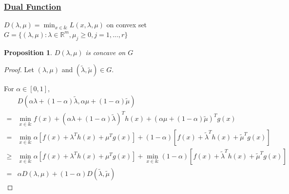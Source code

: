 \documentclass[11pt,a4paper]{article}
\newtheorem{proposition}{Proposition}
\begin{document}
\subsubsection*{\underline{Dual Function}}
$D(\lambda,\mu)=\min_{x\in\&}L(x,\lambda,\mu)$ on convex set $G=\{(\lambda,\mu):\lambda\in \mathbb{R}^m,\mu_j\geq 0,j=1,...,r\}$
\begin{proposition}
    $D(\lambda,\mu)$ is concave on $G$
\end{proposition}
\begin{proof}
    Let $(\lambda,\mu)$ and $(\tilde{\lambda},\tilde{\mu})\in G$.

    For $\alpha\in[0,1]$,
    \begin{equation}
        \begin{aligned}
            &D(\alpha\lambda+(1-\alpha)\tilde{\lambda},\alpha\mu+(1-\alpha)\tilde{\mu})\\
            =&\min_{x\in\&}f(x)+(\alpha\lambda+(1-\alpha)\tilde{\lambda})^Th(x)+(\alpha\mu+(1-\alpha)\tilde{\mu})^Tg(x)\\
            =&\min_{x\in\&}\alpha [f(x)+\lambda^Th(x)+\mu^Tg(x)]+(1-\alpha)[f(x)+\tilde{\lambda}^Th(x)+\tilde{\mu}^Tg(x)]\\
            \geq& \min_{x\in \&}\alpha [f(x)+\lambda^Th(x)+\mu^Tg(x)]+\min_{x\in \&}(1-\alpha)[f(x)+\tilde{\lambda}^Th(x)+\tilde{\mu}^Tg(x)]\\
            =&\alpha D(\lambda,\mu)+(1-\alpha)D(\tilde{\lambda},\tilde{\mu})
        \end{aligned}
        \nonumber
    \end{equation}
\end{proof}
\end{document}

